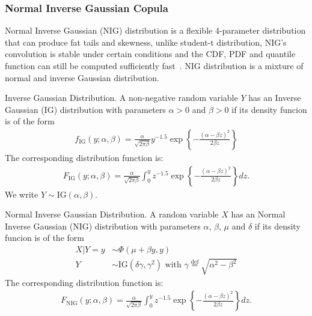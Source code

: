 \subsubsection{Normal Inverse Gaussian Copula}
Normal Inverse Gaussian (NIG) distribution is a flexible 4-parameter distribution that can produce fat tails and skewness, unlike student-t distribution,
NIG's convolution is stable under certain conditions and the CDF, PDF and quantile function can still be computed sufficiently fast~\cite[chapter 5]{schlosser2011pricing}.
NIG distribution is a mixture of normal and inverse Gaussian distribution.
\begin{definition} Inverse Gaussian Distribution.
    A non-negative random variable $Y$ has an Inverse Gaussian (IG) distribution with parameters $\alpha >0$ and $\beta >0$ if its density funcion is of the form
    \begin{align}
        f_\text{IG}(y; \alpha, \beta) = \frac{\alpha}{\sqrt{2\pi \beta}}y^{-1.5} \exp\left\{
        -\frac{(\alpha - \beta z)^2}{2\beta z}
        \right\}
    \end{align}
    The corresponding distribution function is:
        \begin{align}
        F_\text{IG}(y; \alpha, \beta) = \frac{\alpha}{\sqrt{2\pi \beta}}
        \int_0^y z^{-1.5} \exp\left\{
        -\frac{(\alpha - \beta z)^2}{2\beta z}
        \right\}
            dz.
    \end{align}
    We write $Y \sim \text{IG}(\alpha, \beta)$.
    \end{definition}

\begin{definition} Normal Inverse Gaussian Distribution.
    A random variable $X$ has an Normal Inverse Gaussian (NIG) distribution with parameters $\alpha$, $\beta$, $\mu$ and $\delta$ if its density funcion is of the form
    \begin{align}
        X|Y=y &\sim \Phi(\mu + \beta y, y)\\
            Y &\sim \text{IG}(\delta \gamma, \gamma^2) \text{ with } \gamma \overset{\text{def}}{=}\sqrt{\alpha^2-\beta^2}
    \end{align}
    The corresponding distribution function is:
        \begin{align}
        F_\text{NIG}(y; \alpha, \beta) = \frac{\alpha}{\sqrt{2\pi \beta}}
        \int_0^y z^{-1.5} \exp\left\{
        -\frac{(\alpha - \beta z)^2}{2\beta z}
        \right\}
            dz.
    \end{align}
    \end{definition}






